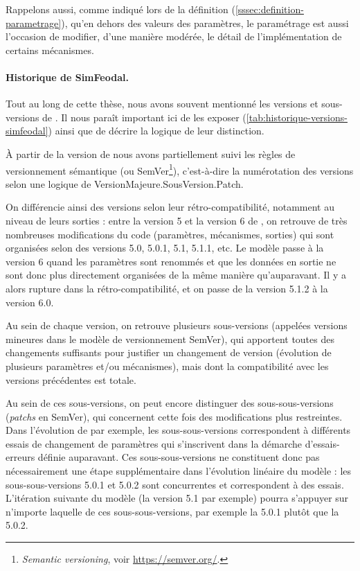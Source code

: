 Rappelons aussi, comme indiqué lors de la définition (\cref{sssec:definition-parametrage}), qu'en dehors des valeurs des paramètres, le paramétrage est aussi l'occasion de modifier, d'une manière modérée, le détail de l'implémentation de certains mécanismes.

\paragraph{Historique de SimFeodal.}\label{par:historique-versions-simfeodal}

Tout au long de cette thèse, nous avons souvent mentionné les versions et sous-versions de \simfeodal{}.
Il nous paraît important ici de les exposer (\cref{tab:historique-versions-simfeodal}) ainsi que de décrire la logique de leur distinction.



À partir de la version \fg{} de \simfeodal{} nous avons partiellement suivi les règles de \og versionnement sémantique\fg{} (ou \og SemVer\fg{}\footnote{
	\og \textit{Semantic versioning}\fg{}, voir \href{https://semver.org/}{https://semver.org/}.
}), c'est-à-dire la numérotation des versions selon une logique de \og VersionMajeure.SousVersion.Patch\fg{}.

On différencie ainsi des versions selon leur rétro-compatibilité, notamment au niveau de leurs sorties : entre la version 5 et la version 6 de \simfeodal{}, on retrouve de très nombreuses modifications du code (paramètres, mécanismes, sorties) qui sont organisées selon des versions 5.0, 5.0.1, 5.1, 5.1.1, etc.
Le modèle passe à la version 6 quand les paramètres sont renommés et que les données en sortie ne sont donc plus directement organisées de la même manière qu'auparavant.
Il y a alors rupture dans la rétro-compatibilité, et on passe de la version 5.1.2 à la version 6.0.

Au sein de chaque version, on retrouve plusieurs sous-versions (appelées \og versions mineures\fg{} dans le modèle de versionnement SemVer), qui apportent toutes des changements suffisants pour justifier un changement de version (évolution de plusieurs paramètres et/ou mécanismes), mais dont la compatibilité avec les versions précédentes est totale.

Au sein de ces sous-versions, on peut encore distinguer des \og sous-sous-versions\fg{} (\og \textit{patchs}\fg{} en SemVer), qui concernent cette fois des modifications plus restreintes.
Dans l'évolution de \simfeodal{} par exemple, les sous-sous-versions correspondent à différents essais de changement de paramètres qui s'inscrivent dans la démarche d'essais-erreurs définie auparavant.
Ces sous-sous-versions ne constituent donc pas nécessairement une étape supplémentaire dans l'évolution \og linéaire\fg{} du modèle : les sous-sous-versions 5.0.1 et 5.0.2 sont concurrentes et correspondent à des essais.
L'itération suivante du modèle (la version 5.1 par exemple) pourra s'appuyer sur n'importe laquelle de ces sous-sous-versions, par exemple la 5.0.1 plutôt que la 5.0.2.

